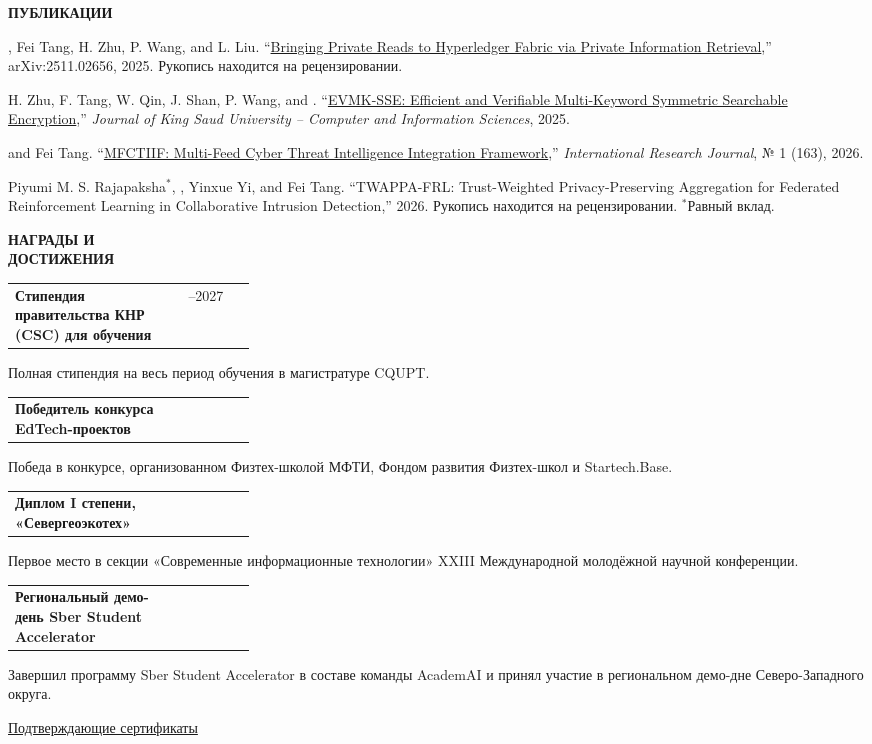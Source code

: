 \documentclass[11pt,a4paper]{article}
\makeatletter
\newcommand{\cvrow}[2]{%
  \noindent
  \begin{minipage}[t]{0.145\textwidth}
    \vspace{0pt}%
    \raggedright
    \fontsize{8.5}{10}\selectfont
    \bfseries\MakeUppercase{#1}
  \end{minipage}%
  \hfill
  \begin{minipage}[t]{0.835\textwidth}
    \vspace{0pt}%
    #2
  \end{minipage}\par
}
\newcommand{\entry}[2]{%
  \begin{tabularx}{\linewidth}{@{}X >{\raggedleft\arraybackslash}p{0.28\linewidth}@{}}
    #1 & #2
  \end{tabularx}
}
\newcommand{\pub}[2]{%
  #1 #2\par
  \vspace{0.28em}
}
\makeatother
\begin{document}
\vspace{0.75em}

\cvrow{Публикации}{%
  \pub{, Fei Tang, H. Zhu, P. Wang, and L. Liu.}
  {``\href{https://arxiv.org/abs/2511.02656}
  {Bringing Private Reads to Hyperledger Fabric via Private Information Retrieval},''
  arXiv:2511.02656, 2025. Рукопись находится на рецензировании.}

  \pub{H. Zhu, F. Tang, W. Qin, J. Shan, P. Wang, and \underbar{Artur Iasenovets}.}
  {``\href{https://doi.org/10.1007/s44443-025-00405-8}
  {EVMK-SSE: Efficient and Verifiable Multi-Keyword Symmetric Searchable Encryption},''
  \textit{Journal of King Saud University -- Computer and Information Sciences}, 2025.}

  \pub{\underbar{Artur Iasenovets} and Fei Tang.}
  {``\href{https://doi.org/10.60797/IRJ.2026.163.57}
  {MFCTIIF: Multi-Feed Cyber Threat Intelligence Integration Framework},''
  \textit{International Research Journal}, № 1 (163), 2026.}

  \pub{Piyumi M. S. Rajapaksha$^{*}$, \underbar{Artur Iasenovets$^{*}$},
  Yinxue Yi, and Fei Tang.}
  {``TWAPPA-FRL: Trust-Weighted Privacy-Preserving Aggregation for Federated
  Reinforcement Learning in Collaborative Intrusion Detection,''
  2026. Рукопись находится на рецензировании. $^{*}$Равный вклад.}
}

\vspace{0.75em}

\cvrow{Награды и\\достижения}{%
  \entry
    {\textbf{Стипендия правительства КНР (CSC) для обучения}}
    {2024--2027}
  Полная стипендия на весь период обучения в магистратуре CQUPT.

  \vspace{0.45em}
  \entry
    {\textbf{Победитель конкурса EdTech-проектов}}
    {2023}
  Победа в конкурсе, организованном Физтех-школой МФТИ,
  Фондом развития Физтех-школ и Startech.Base.

  \vspace{0.45em}
  \entry
    {\textbf{Диплом I степени, «Севергеоэкотех»}}
    {2022}
  Первое место в секции «Современные информационные технологии»
  XXIII Международной молодёжной научной конференции.

  \vspace{0.45em}
  \entry
    {\textbf{Региональный демо-день Sber Student Accelerator}}
    {2023}
  Завершил программу Sber Student Accelerator в составе команды AcademAI
  и принял участие в региональном демо-дне Северо-Западного округа.

  \vspace{0.3em}
  \href{https://iasenovets.github.io/files/certificates_selected_en_public_ready_v2.pdf}
       {\small Подтверждающие сертификаты}
}
\end{document}
